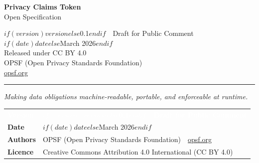 \documentclass[11pt,a4paper]{article}
\title{}  %
\renewcommand{\arraystretch}{1.4}
\newcommand{\pctsep}{\,\textperiodcentered\,}
\begin{document}
\thispagestyle{empty}
\pagecolor{pctnavy}


\vspace*{3cm}

\begin{flushleft}
  {\fontsize{32}{38}\selectfont\bfseries\color{white} Privacy Claims Token}\\[0.5cm]
  {\Large\color{white!70!pctnavy} Open Specification}
\end{flushleft}

\vspace{2cm}

\begin{tcolorbox}[
  colback=pctnavy,
  colframe=white!25!pctnavy,
  arc=2pt,
  boxrule=0.6pt,
  left=12pt,
  right=12pt,
  top=10pt,
  bottom=10pt
]
{\small\color{white!80!pctnavy}
  $if(version)$$version$$else$0.1$endif$ \pctsep{} Draft for Public Comment\\[0.5em]
  $if(date)$$date$$else$March 2026$endif$\\[0.5em]
  Released under CC BY 4.0\\[0.5em]
  OPSF (Open Privacy Standards Foundation)\\[0.5em]
  \href{https://opsf.org}{\color{pctgold}opsf.org}
}
\end{tcolorbox}

\vspace{1cm}
{\color{pctgold}\rule{\textwidth}{1.5pt}}

\vspace{1.2cm}
{\normalsize\color{white!65!pctnavy}\textit{Making data obligations machine-readable, portable, and enforceable at runtime.}}

\newpage
\nopagecolor
\setcounter{page}{2}

{\footnotesize
\renewcommand{\arraystretch}{1.4}%
\begin{longtable}[]{@{}>{\raggedright\arraybackslash}p{}>{\raggedright\arraybackslash}p{}@{}}
\rowcolor{pctnavy} \textcolor{white}{\textbf{Version}} & \textcolor{white}{\textbf{$if(version)$$version$$else$0.1$endif$ \pctsep{} Draft for Public Comment}} \\
\textbf{Date} & $if(date)$$date$$else$March 2026$endif$ \\
\hline
\rowcolor{codebg} \textbf{Authors} & OPSF (Open Privacy Standards Foundation) \pctsep{} \href{https://opsf.org}{opsf.org} \\
\hline
\textbf{Licence} & Creative Commons Attribution 4.0 International (CC BY 4.0) \\
\end{longtable}
}
\end{document}
